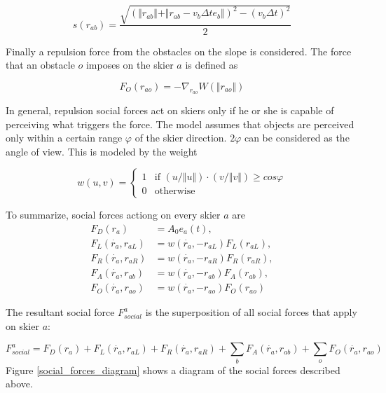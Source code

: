 \documentclass[12pt,a4paper,twoside]{book}
\begin{document}
\begin{equation}\label{skier_s}
s(r_{ab})=\frac{\sqrt{(\Vert r_{ab} \Vert + \Vert r_{ab}-v_b \Delta t e_b \Vert )^2-(v_b \Delta t)^2}}{2}
\end{equation}

Finally a repulsion force from the obstacles on the slope is considered. The force that an obstacle $o$ imposes on the skier $a$ is defined as

\begin{equation}\label{obstacle_force}
F_O(r_{ao})=-\nabla_{r_{ao}}W(\Vert r_{ao} \Vert )
\end{equation}

In general, repulsion social forces act on skiers only if he or she is capable of perceiving what triggers the force. The model assumes that objects are perceived only within a certain range $\varphi$ of the skier direction. $2\varphi$ can be considered as the angle of view. This is modeled by the weight

\begin{equation}\label{visibility}
w(u,v)=\begin{cases}
  1 & \text{if $(u/\Vert u \Vert)\cdot (v/\Vert v \Vert) \geq cos \varphi$} \\
  0 & \text{otherwise }
  \end{cases}
\end{equation}

To summarize, social forces actiong on every skier $a$ are
\begin{align}\label{social_forces_tb}
F_D(r_a)&=A_0 e_a(t),\\
F_L(\dot{r_a},r_{aL})&=w(\dot{r_a},-r_{aL})F_L(r_{aL}),\\
F_R(\dot{r_a},r_{aR})&=w(\dot{r_a},-r_{aR})F_R(r_{aR}),\\
F_A(\dot{r_a},r_{ab})&=w(\dot{r_a},-r_{ab})F_A(r_{ab}),\\
F_O(\dot{r_a},r_{ao})&=w(\dot{r_a},-r_{ao})F_O(r_{ao})
\end{align}

The resultant social force $F^a_{social}$ is the superposition of all social forces that apply on skier $a$:

\begin{equation}
F^a_{social}=F_D(r_a)+F_L(\dot{r_a},r_{aL})+F_R(\dot{r_a},r_{aR})+\sum_b F_A(\dot{r_a},r_{ab})+\sum_o F_O(\dot{r_a},r_{ao})\nonumber
\end{equation}
Figure \ref{social_forces_diagram} shows a diagram of the social forces described above.
\end{document}
